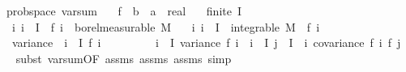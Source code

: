 \begin{isabellebody}
\isamarkupfalse%
%
\endisatagproof
{\isafoldproof}%
%
\isadelimproof
\isanewline
%
\endisadelimproof
\isanewline
{}\isamarkupfalse%
\ {\isacharparenleft}{\kern0pt}\ prob{\isacharunderscore}{\kern0pt}space{\isacharparenright}{\kern0pt}\ var{\isacharunderscore}{\kern0pt}sum{\isacharunderscore}{\kern0pt}{}{\isacharcolon}{\kern0pt}\isanewline
\ \ \ f\ {\isacharcolon}{\kern0pt}{\isacharcolon}{\kern0pt}\ {\isachardoublequoteopen}{\isacharprime}{\kern0pt}b\ {\isasymRightarrow}\ {\isacharprime}{\kern0pt}a\ {\isasymRightarrow}\ real{\isachardoublequoteclose}\isanewline
\ \ \ {\isachardoublequoteopen}finite\ I{\isachardoublequoteclose}\isanewline
\ \ \ {\isachardoublequoteopen}{\isasymAnd}i{\isachardot}{\kern0pt}\ i\ {\isasymin}\ I\ {\isasymLongrightarrow}\ f\ i\ {\isasymin}\ borel{\isacharunderscore}{\kern0pt}measurable\ M{\isachardoublequoteclose}\isanewline
\ \ \ {\isachardoublequoteopen}{\isasymAnd}i{\isachardot}{\kern0pt}\ i\ {\isasymin}\ I\ {\isasymLongrightarrow}\ integrable\ M\ {\isacharparenleft}{\kern0pt}{\isasymlambda}{\isasymomega}{\isachardot}{\kern0pt}\ f\ i\ {\isasymomega}{\isacharcircum}{\kern0pt}{}{\isacharparenright}{\kern0pt}{\isachardoublequoteclose}\isanewline
\ \ \ {\isachardoublequoteopen}variance\ {\isacharparenleft}{\kern0pt}{\isasymlambda}{\isasymomega}{\isachardot}{\kern0pt}\ {\isacharparenleft}{\kern0pt}{\isasymSum}i\ {\isasymin}\ I{\isachardot}{\kern0pt}\ f\ i\ {\isasymomega}{\isacharparenright}{\kern0pt}{\isacharparenright}{\kern0pt}\ {\isacharequal}{\kern0pt}\ \isanewline
\ \ \ \ \ \ {\isacharparenleft}{\kern0pt}{\isasymSum}i\ {\isasymin}\ I{\isachardot}{\kern0pt}\ variance\ {\isacharparenleft}{\kern0pt}f\ i{\isacharparenright}{\kern0pt}{\isacharparenright}{\kern0pt}\ {\isacharplus}{\kern0pt}\ {\isacharparenleft}{\kern0pt}{\isasymSum}i\ {\isasymin}\ I{\isachardot}{\kern0pt}\ {\isasymSum}j\ {\isasymin}\ I\ {\isacharminus}{\kern0pt}\ {\isacharbraceleft}{\kern0pt}i{\isacharbraceright}{\kern0pt}{\isachardot}{\kern0pt}\ covariance\ {\isacharparenleft}{\kern0pt}f\ i{\isacharparenright}{\kern0pt}\ {\isacharparenleft}{\kern0pt}f\ j{\isacharparenright}{\kern0pt}{\isacharparenright}{\kern0pt}{\isachardoublequoteclose}\isanewline
%
\isadelimproof
\ \ %
\endisadelimproof
%
\isatagproof
{}\isamarkupfalse%
\ {\isacharparenleft}{\kern0pt}subst\ var{\isacharunderscore}{\kern0pt}sum{\isacharunderscore}{\kern0pt}{}{\isacharbrackleft}{\kern0pt}OF\ assms{\isacharparenleft}{\kern0pt}{}{\isacharparenright}{\kern0pt}\ assms{\isacharparenleft}{\kern0pt}{}{\isacharparenright}{\kern0pt}\ assms{\isacharparenleft}{\kern0pt}{}{\isacharparenright}{\kern0pt}{\isacharbrackright}{\kern0pt}{\isacharcomma}{\kern0pt}\ simp{\isacharparenright}{\kern0pt}\isanewline

\end{isabellebody}
